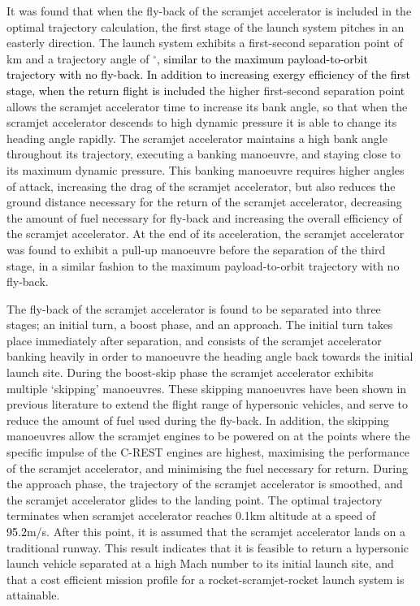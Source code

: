 It was found that when the fly-back of the scramjet accelerator is included in the optimal trajectory calculation, the first stage of the launch system pitches in an easterly direction. 
The launch system exhibits a first-second separation point of \firstsecondSeparationAltStandard km and a trajectory angle of \firstsecondSeparationgammaStandard $^\circ$, \textcolor{black}{similar to the maximum payload-to-orbit trajectory with no fly-back. 
In addition to increasing exergy efficiency of the first stage, when the return flight is included} the higher first-second separation point allows the scramjet accelerator time to increase its bank angle, so that when the scramjet accelerator descends to high dynamic pressure it is able to change its heading angle rapidly. The scramjet accelerator maintains a high bank angle throughout its trajectory, executing a banking manoeuvre, and staying close to its maximum dynamic pressure. 
This banking manoeuvre requires higher angles of attack, increasing the drag of the scramjet accelerator, but also reduces the ground distance necessary for the return of the scramjet accelerator, decreasing the amount of fuel necessary for fly-back and increasing the overall efficiency of the scramjet accelerator. 
At the end of its acceleration, the scramjet accelerator was found to exhibit a pull-up manoeuvre before the separation of the third stage, in a similar fashion to the maximum payload-to-orbit trajectory with no fly-back. 

The fly-back of the scramjet accelerator is found to be separated into three stages; an initial turn, a boost phase, and an approach. 
The initial turn takes place immediately after separation, and consists of the scramjet accelerator banking heavily in order to manoeuvre the heading angle back towards the initial launch site. 
During the boost-skip phase the scramjet accelerator exhibits multiple `skipping' manoeuvres. These skipping manoeuvres have been shown in previous literature to extend the flight range of hypersonic vehicles\cite{Moshman2014,Darby2011,Toso2015,Tetlow1992,Eggers1957,Kanda2007,Chai2015}, and serve to reduce the amount of fuel used during the fly-back.
In addition, the skipping manoeuvres allow the scramjet engines to be powered on at the points where the specific impulse of the C-REST engines are highest, maximising the performance of the scramjet accelerator, and minimising the fuel necessary for return. 
During the approach phase, the trajectory of the scramjet accelerator is smoothed, and the scramjet accelerator glides to the landing point. 
 The optimal trajectory terminates when scramjet accelerator reaches 0.1km altitude at a speed of \textcolor{black}{95.2}m/s. After this point, it is assumed that the scramjet accelerator lands on a traditional runway.  
This result indicates that it is feasible to return a hypersonic launch vehicle separated at a high Mach number to its initial launch site, and that a cost efficient mission profile for a rocket-scramjet-rocket launch system is attainable.  

